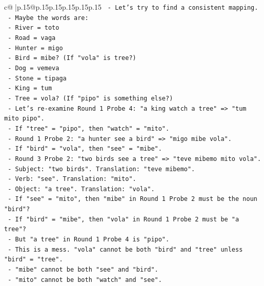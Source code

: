 \documentclass{article}
\begin{document}
{\begin{supertabular}{c@{$\;$}|p{.15\linewidth}@{}p{.15\linewidth}p{.15\linewidth}p{.15\linewidth}p{.15\linewidth}p{.15\linewidth}}
{{{\texttt{              {-} Let's try to find a consistent mapping.} \\
\texttt{              {-} Maybe the words are:} \\
\texttt{                {-} River = toto} \\
\texttt{                {-} Road = vaga} \\
\texttt{                {-} Hunter = migo} \\
\texttt{                {-} Bird = mibe? (If "vola" is tree?)} \\
\texttt{                {-} Dog = vemeva} \\
\texttt{                {-} Stone = tipaga} \\
\texttt{                {-} King = tum} \\
\texttt{                {-} Tree = vola? (If "pipo" is something else?)} \\
\texttt{              {-} Let's re{-}examine Round 1 Probe 4: "a king watch a tree" => "tum mito pipo".} \\
\texttt{                {-} If "tree" = "pipo", then "watch" = "mito".} \\
\texttt{              {-} Round 1 Probe 2: "a hunter see a bird" => "migo mibe vola".} \\
\texttt{                {-} If "bird" = "vola", then "see" = "mibe".} \\
\texttt{              {-} Round 3 Probe 2: "two birds see a tree" => "teve mibemo mito vola".} \\
\texttt{                {-} Subject: "two birds". Translation: "teve mibemo".} \\
\texttt{                {-} Verb: "see". Translation: "mito".} \\
\texttt{                {-} Object: "a tree". Translation: "vola".} \\
\texttt{                {-} If "see" = "mito", then "mibe" in Round 1 Probe 2 must be the noun "bird"?} \\
\texttt{                {-} If "bird" = "mibe", then "vola" in Round 1 Probe 2 must be "a tree"?} \\
\texttt{                {-} But "a tree" in Round 1 Probe 4 is "pipo".} \\
\texttt{                {-} This is a mess. "vola" cannot be both "bird" and "tree" unless "bird" = "tree".} \\
\texttt{                {-} "mibe" cannot be both "see" and "bird".} \\
\texttt{                {-} "mito" cannot be both "watch" and "see".} \\
}}}
\end{supertabular}}
\end{document}
